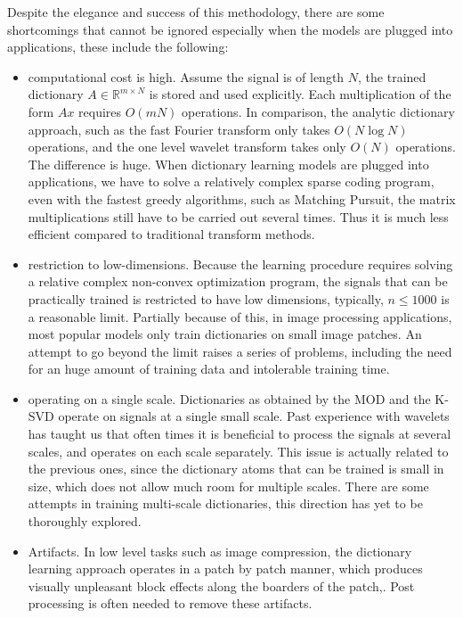 \documentclass[a4paper]{article}
\begin{document}
Despite the elegance and success of this methodology, there are some shortcomings that cannot be ignored especially when the models are plugged into applications, these include the following:
\begin{itemize}
\item computational cost is high. Assume the signal is of length $N$, the trained dictionary $A\in \mathbb{R}^{m\times N}$ is stored and used explicitly. Each multiplication of the form $Ax$ requires $O(mN)$ operations. In comparison, the analytic dictionary approach, such as the fast Fourier transform only takes $O(N\log N)$ operations, and the one level wavelet transform takes only $O(N)$ operations. The difference is huge. When dictionary learning models are plugged into applications, we have to solve a relatively complex sparse coding program, even with the fastest greedy algorithms, such as Matching Pursuit, the matrix multiplications still have to be carried out several times. Thus it is much less efficient compared to traditional transform methods.
\item restriction to low-dimensions. Because the learning procedure requires solving a relative complex non-convex optimization program, the signals that can be practically trained is restricted to have low dimensions, typically, $n\leq 1000$ is a reasonable limit. Partially because of this, in image processing applications, most popular models only train dictionaries on small image patches. An attempt to go beyond the limit raises a series of problems, including the need for an huge amount of training data and intolerable training time.
\item operating on a single scale. Dictionaries as obtained by the MOD and the K-SVD operate on signals at a single small scale. Past experience with wavelets has taught us that often times it is beneficial to process the signals at several scales, and operates on each scale separately. This issue is actually related to the previous ones, since the dictionary atoms that can be trained is small in size, which does not allow much room for multiple scales. There are some attempts in training multi-scale dictionaries, this direction has yet to be thoroughly explored.
\item Artifacts.  In low level tasks such as image compression, the dictionary learning approach operates in a patch by patch manner, which produces visually unpleasant block effects along the boarders of the patch,\cite{bryt2008compression}.  Post processing is often needed to remove these artifacts\cite{bryt2008improving}. 
\end{itemize}
\end{document}
